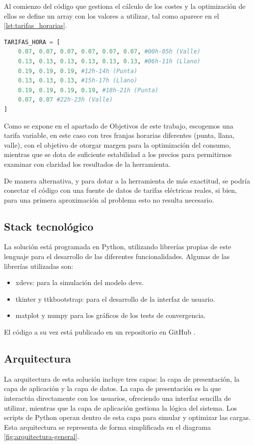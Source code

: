 \documentclass[11pt,a4paper]{book}
\begin{document}
Al comienzo del código que gestiona el cálculo de los costes y la optimización de ellos se define un array con los valores a utilizar, tal como aparece en el \autoref{lst:tarifas_horarias}.

\begin{lstlisting}[language=Python, caption={Definición de tarifas horarias}, label={lst:tarifas_horarias}]
TARIFAS_HORA = [
    0.07, 0.07, 0.07, 0.07, 0.07, 0.07, #00h-05h (Valle)
    0.13, 0.13, 0.13, 0.13, 0.13, 0.13, #06h-11h (Llano)
    0.19, 0.19, 0.19, #12h-14h (Punta)
    0.13, 0.13, 0.13, #15h-17h (Llano)
    0.19, 0.19, 0.19, 0.19, #18h-21h (Punta)
    0.07, 0.07 #22h-23h (Valle)
]
\end{lstlisting}

Como se expone en el apartado de Objetivos de este trabajo, escogemos una tarifa variable, en este caso con tres franjas horarias diferentes (punta, llana, valle), con el objetivo de otorgar margen para la optimización del consumo, mientras que se dota de suficiente estabilidad a los precios para permitirnos examinar con claridad los resultados de la herramienta.

De manera alternativa, y para dotar a la herramienta de más exactitud, se podría conectar el código con una fuente de datos de tarifas eléctricas reales, si bien, para una primera aproximación al problema esto no resulta necesario.

\subsection{Stack tecnológico}
La solución está programada en Python, utilizando librerías propias de este lenguaje para el desarrollo de las diferentes funcionalidades. Algunas de las librerías utilizadas son:
    \begin{itemize}
    \item xdevs: para la simulación del modelo \gls{devs}.
    \item tkinter y ttkbootstrap: para el desarrollo de la interfaz de usuario.
    \item matplot y numpy para los gráficos de los tests de convergencia.
    \end{itemize}
El código a su vez está publicado en un repositorio en GitHub \cite{ainaralarbi2025}.
\subsection{Arquitectura}
La arquitectura de esta solución incluye tres capas: la capa de presentación, la capa de aplicación y la capa de datos.
La capa de presentación es la que interactúa directamente con los usuarios, ofreciendo una interfaz sencilla de utilizar, mientras que la capa de aplicación gestiona la lógica del sistema. Los scripts de Python operan dentro de esta capa para simular y optimizar las cargas. 
Esta arquitectura se representa de forma simplificada en el diagrama \ref{fig:arquitectura-general}.
\end{document}
